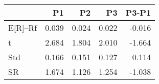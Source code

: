 \begin{tabular}{lrrrr}
\toprule
 & P1 & P2 & P3 & P3-P1 \\
\midrule
E[R]--Rf & 0.039 & 0.024 & 0.022 & -0.016 \\
t & 2.684 & 1.804 & 2.010 & -1.664 \\
Std & 0.166 & 0.151 & 0.127 & 0.114 \\
SR & 1.674 & 1.126 & 1.254 & -1.038 \\
\bottomrule
\end{tabular}
